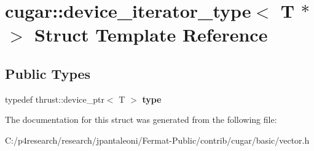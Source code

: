 \hypertarget{structcugar_1_1device__iterator__type_3_01_t_01_5_01_4}{}\section{cugar\+:\+:device\+\_\+iterator\+\_\+type$<$ T $\ast$ $>$ Struct Template Reference}
\label{structcugar_1_1device__iterator__type_3_01_t_01_5_01_4}
\subsection*{Public Types}
\begin{DoxyCompactItemize}
\item 
typedef thrust\+::device\+\_\+ptr$<$ T $>$ {\bfseries type}
\end{DoxyCompactItemize}


The documentation for this struct was generated from the following file\+:\begin{DoxyCompactItemize}
\item 
C\+:/p4research/research/jpantaleoni/\+Fermat-\/\+Public/contrib/cugar/basic/vector.\+h\end{DoxyCompactItemize}
